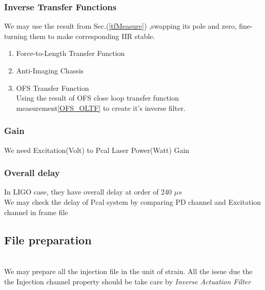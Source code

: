     \subsubsection{Inverse Transfer Functions}
        We may use the result from Sec.(\ref{tfMeasure}) ,swapping its pole and zero, fine-turning them to make corresponding IIR stable.
        \begin{enumerate}
            \item Force-to-Length Transfer Function
            \item Anti-Imaging Chassis   
            \item OFS Transfer Function \\
            Using the result of OFS close loop transfer function measurement\ref{OFS_OLTF} to create it's inverse filter. 
        \end{enumerate}


    \subsubsection{Gain}
    We need Excitation(Volt) to Pcal Laser Power(Watt) Gain
    
    \subsubsection{Overall delay}
In LIGO case, they have overall delay at order of 240 $\mu s$ \cite{ligo:inj}\\
We may check the delay of Pcal system by comparing PD channel and Excitation channel in frame file


\subsection{File preparation}
\\
We may prepare all the injection file in the unit of strain. All the issue due the the Injection channel property should be take care by \emph{Inverse Actuation Filter}
